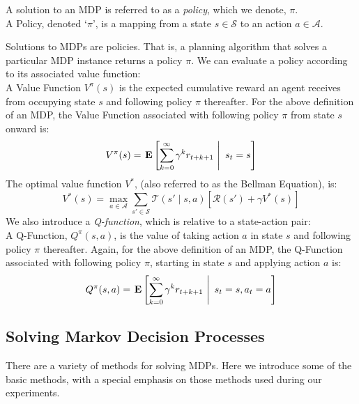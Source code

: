 \documentclass[11pt]{article}
\begin{document}
A solution to an MDP is referred to as a {\it policy}, which we denote, $\pi$. \\

{ A \textup{Policy}, denoted `$\pi$', is a mapping from a state $s \in \mathcal{S}$ to an action $a \in \mathcal{A}$.}

Solutions to MDPs are policies. That is, a planning algorithm that solves a particular MDP instance returns a policy $\pi$. We can evaluate a policy according to its associated value function: \\

{ A \textup{Value Function} $V^\pi(s)$ is the expected cumulative reward an agent receives from occupying state $s$ and following policy $\pi$ thereafter.}
For the above definition of an MDP, the Value Function associated with following policy $\pi$ from state $s$ onward is:
\begin{equation}
V^\pi(s) = \left.{\bf E} \left[ \sum_{k=0}^\infty \gamma^k r_{t+k+1}\ \right|\ s_t = s \right]
\end{equation}
{ The \textup{optimal value function} $V^*$, (also referred to as the Bellman Equation), is:
\begin{equation}
V^*(s) = \max_{a \in \mathcal{A}} \sum_{s' \in \mathcal{S}} \mathcal{T}(s' \mid s, a) \left[\mathcal{R}(s') + \gamma V^*(s) \right]
\label{eq:bellman_equation}
\end{equation}}
We also introduce a {\it Q-function}, which is relative to a state-action pair: \\
{ A \textup{Q-Function}, $Q^\pi(s,a)$, is the value of taking action $a$ in state $s$ and following policy $\pi$ thereafter}.
Again, for the above definition of an MDP, the Q-Function associated with following policy $\pi$, starting in state $s$ and applying action $a$ is:
\begin{equation}
Q^\pi(s,a) = \left.{\bf E} \left[ \sum_{k=0}^\infty \gamma^k r_{t+k+1}\ \right|\ s_t = s, a_t = a \right]
\end{equation}





\subsection{Solving Markov Decision Processes}

There are a variety of methods for solving MDPs. Here we introduce some of the basic methods, with a special emphasis on those methods used during our experiments.
\end{document}
